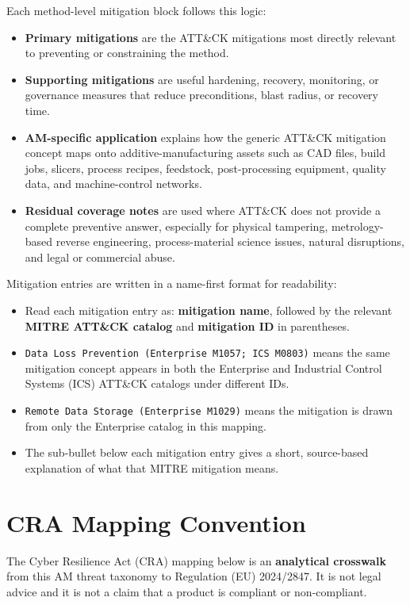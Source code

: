 \documentclass[10pt,a4paper,oneside]{report}
\begin{document}
Each method-level mitigation block follows this logic:

\begin{itemize}
\item \textbf{Primary mitigations} are the ATT\&CK mitigations most directly relevant to preventing or constraining the method.
\item \textbf{Supporting mitigations} are useful hardening, recovery, monitoring, or governance measures that reduce preconditions, blast radius, or recovery time.
\item \textbf{AM-specific application} explains how the generic ATT\&CK mitigation concept maps onto additive-manufacturing assets such as CAD files, build jobs, slicers, process recipes, feedstock, post-processing equipment, quality data, and machine-control networks.
\item \textbf{Residual coverage notes} are used where ATT\&CK does not provide a complete preventive answer, especially for physical tampering, metrology-based reverse engineering, process-material science issues, natural disruptions, and legal or commercial abuse.
\end{itemize}

Mitigation entries are written in a name-first format for readability:

\begin{itemize}
\item Read each mitigation entry as: \textbf{mitigation name}, followed by the relevant \textbf{MITRE ATT\&CK catalog} and \textbf{mitigation ID} in parentheses.
\item \texttt{Data Loss Prevention (Enterprise M1057; ICS M0803)} means the same mitigation concept appears in both the Enterprise and Industrial Control Systems (ICS) ATT\&CK catalogs under different IDs.
\item \texttt{Remote Data Storage (Enterprise M1029)} means the mitigation is drawn from only the Enterprise catalog in this mapping.
\item The sub-bullet below each mitigation entry gives a short, source-based explanation of what that MITRE mitigation means.
\end{itemize}


\chapter{CRA Mapping Convention}


The Cyber Resilience Act (CRA) mapping below is an \textbf{analytical crosswalk} from this AM threat taxonomy to Regulation (EU) 2024/2847. It is not legal advice and it is not a claim that a product is compliant or non-compliant.
\end{document}
